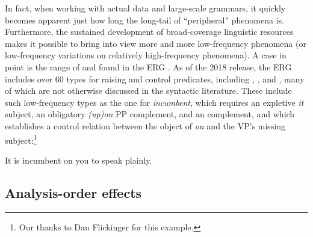 \documentclass[output=paper,nonflat]{langsci/langscibook}
\begin{document}
In fact, when working with actual data and large-scale grammars,
it quickly becomes apparent just how long the long-tail of ``peripheral'' phenomena is. Furthermore, the sustained development of broad-coverage linguistic resources makes it possible
to bring into view more and more low-frequency phenomena
(or low-frequency variations on relatively high-frequency phenomena).
A case in point is the range of  and  
found in the ERG \citep{Flickinger2000a,Flickinger2011a-u}.
As of the 2018 release, the ERG includes over 60 types for raising and control predicates,
including , , and ,
many of which are not otherwise discussed in the syntactic literature.
These include such low-frequency types as the one for \textit{incumbent},
which requires an expletive \textit{it} subject,
an obligatory \textit{(up)on} PP complement,
and an  complement,
and which establishes a control relation between
the object of \textit{on} and the VP's missing subject:\footnote{%
	Our thanks to Dan Flickinger for this example.
}

\begin{exe}
\ex\label{cl:incumbent} 
It is incumbent on you to speak plainly.
\end{exe}%
%



\subsection{Analysis-order effects}
\end{document}
